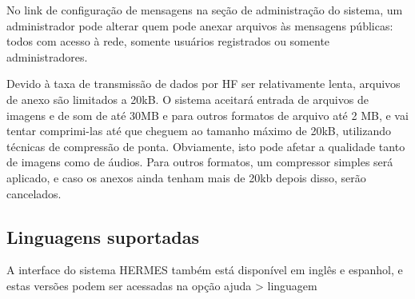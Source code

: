 \documentclass[11pt,a4paper]{article}
\begin{document}

No link de configuração de mensagens na seção de administração do sistema, um administrador pode alterar quem pode anexar arquivos às mensagens públicas: todos com acesso à rede, somente usuários registrados ou somente administradores.


Devido à taxa de transmissão de dados por HF ser relativamente lenta, arquivos de anexo são limitados a 20kB. O sistema aceitará entrada de arquivos de imagens e de som de até 30MB e para outros formatos de arquivo até 2 MB, e vai tentar comprimi-las até que cheguem ao tamanho máximo de 20kB, utilizando técnicas de compressão de ponta. Obviamente, isto pode afetar a qualidade tanto de imagens como de áudios. Para outros formatos, um compressor simples será aplicado, e caso os anexos ainda tenham mais de 20kb depois disso, serão cancelados.




\subsection{Linguagens suportadas}
\label{langs}

A interface do sistema HERMES também está disponível em inglês e espanhol, e estas versões podem ser acessadas na opção ajuda > linguagem
\end{document}
